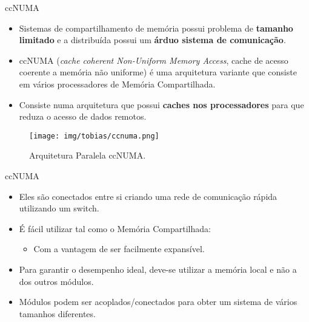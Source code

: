 
\begin{frame}{ccNUMA}
	\begin{itemize}
		\item Sistemas de compartilhamento de memória possui problema de \textbf{tamanho limitado} e a distribuída possui um \textbf{árduo sistema de comunicação}. 
		\item ccNUMA (\textit{cache coherent Non-Uniform Memory Access}, cache de acesso coerente a memória não uniforme) é uma arquitetura variante que consiste em vários processadores de Memória Compartilhada.
		\item Consiste numa arquitetura que possui \textbf{caches nos processadores} para que reduza o acesso de dados remotos.
	\end{itemize}

\end{frame}


\begin{frame}
    \begin{figure}[h]
    	\centering
    	\texttt{[image: img/tobias/ccnuma.png]}
    	\caption{Arquitetura Paralela ccNUMA.}
    	\label{fig:ccnuma}
    \end{figure}

\end{frame}


\begin{frame}{ccNUMA}
    \begin{itemize}
		\item Eles são conectados entre si criando uma rede de comunicação rápida utilizando um switch.
		\item É fácil utilizar tal como o Memória Compartilhada: 
		\begin{itemize}
		    \item Com a vantagem de ser facilmente expansível.
		\end{itemize}

		\item Para garantir o desempenho ideal, deve-se utilizar a memória local e não a dos outros módulos.
		\item Módulos podem ser acoplados/conectados para obter um sistema de vários tamanhos diferentes.	
	\end{itemize}

\end{frame}









